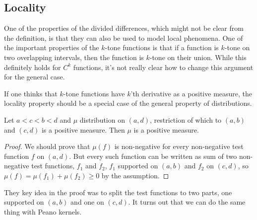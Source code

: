 \subsection{Locality}

One of the properties of the divided differences, which might not be clear from the definition, is that they can also be used to model local phenomena. One of the important properties of the $k$-tone functions is that if a function is $k$-tone on two overlapping intervals, then the function is $k$-tone on their union. While this definitely holds for $C^{k}$ functions, it's not really clear how to change this argument for the general case.

If one thinks that $k$-tone functions have $k$'th derivative as a positive measure, the locality property should be a special case of the general property of distributions.
\begin{prop}
	Let $a < c < b < d$ and $\mu$ distribution on $(a, d)$, restriction of which to $(a, b)$ and $(c, d)$ is a positive measure. Then $\mu$ is a positive measure.
\end{prop}
\begin{proof}
	We should prove that $\mu(f)$ is non-negative for every non-negative test function $f$ on $(a, d)$. But every such function can be written as sum of two non-negative test functions, $f_{1}$ and $f_{2}$, $f_{1}$ supported on $(a, b)$ and $f_{2}$ on $(c, d)$, so $\mu(f) = \mu(f_{1}) + \mu(f_{2}) \geq 0$ by the assumption.
\end{proof}

They key idea in the proof was to split the test functions to two parts, one supported on $(a, b)$ and one on $(c, d)$. It turns out that we can do the same thing with Peano kernels.

